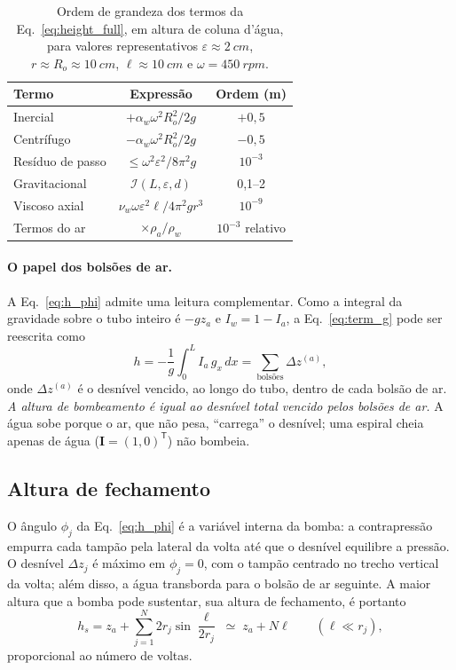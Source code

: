 \documentclass[aps,pre,twocolumn,superscriptaddress,nofootinbib,floatfix]{revtex4-2}
\begin{document}
\begin{table}[b]
  \caption{Ordem de grandeza dos termos da Eq.~\eqref{eq:height_full}, em altura de coluna d'água, para valores representativos $\varepsilon\approx\SI{2}{cm}$, $r\approx R_o\approx\SI{10}{cm}$, $\ell\approx\SI{10}{cm}$ e $\omega=\SI{450}{rpm}$.}
  \label{tab:terms}
  \begin{ruledtabular}
  \begin{tabular}{lcc}
    Termo & Expressão & Ordem (m) \\
    \midrule
    Inercial & $+\alpha_w\omega^2R_o^2/2g$ & $+0{,}5$ \\
    Centrífugo & $-\alpha_w\omega^2R_o^2/2g$ & $-0{,}5$ \\
    Resíduo de passo & $\le\omega^2\varepsilon^2/8\pi^2g$ & $10^{-3}$ \\
    Gravitacional & $\mathcal I(L,\varepsilon,d)$ & 0,1--2 \\
    Viscoso axial & $\nu_w\omega\varepsilon^2\ell/4\pi^2gr^3$ & $10^{-9}$ \\
    Termos do ar & $\times\rho_a/\rho_w$ & $10^{-3}$ relativo \\
  \end{tabular}
  \end{ruledtabular}
\end{table}

\paragraph*{O papel dos bolsões de ar.} A Eq.~\eqref{eq:h_phi} admite uma leitura complementar. Como a integral da gravidade sobre o tubo inteiro é $-gz_a$ e $I_w=1-I_a$, a Eq.~\eqref{eq:term_g} pode ser reescrita como
\begin{equation}
  h = -\frac1g\int_0^L I_a\,g_x\,dx = \sum_{\text{bolsões}}\Delta z^{(a)} ,
  \label{eq:airidentity}
\end{equation}
onde $\Delta z^{(a)}$ é o desnível vencido, ao longo do tubo, dentro de cada bolsão de ar. \emph{A altura de bombeamento é igual ao desnível total vencido pelos bolsões de ar.} A água sobe porque o ar, que não pesa, ``carrega'' o desnível; uma espiral cheia apenas de água ($\mathbf I=(1,0)^{\mathsf T}$) não bombeia.

\subsection{Altura de fechamento}

O ângulo $\phi_j$ da Eq.~\eqref{eq:h_phi} é a variável interna da bomba: a contrapressão empurra cada tampão pela lateral da volta até que o desnível equilibre a pressão. O desnível $\Delta z_j$ é máximo em $\phi_j=0$, com o tampão centrado no trecho vertical da volta; além disso, a água transborda para o bolsão de ar seguinte. A maior altura que a bomba pode sustentar, sua altura de fechamento, é portanto
\begin{equation}
  h_s = z_a + \sum_{j=1}^{N}2r_j\sin\frac{\ell}{2r_j} \;\simeq\; z_a + N\ell \qquad (\ell\ll r_j),
  \label{eq:hs}
\end{equation}
proporcional ao número de voltas.
\end{document}
